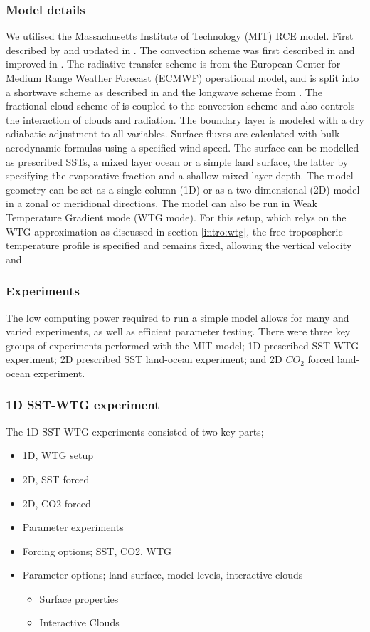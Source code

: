\subsubsection{Model details}
We utilised the Massachusetts Institute of Technology (MIT) RCE model. First 
described by \citet{Renno1994} and updated in \citet{Bony2001}.  The convection 
scheme was first described in \citet{Emanuel1991} and improved in 
\citet{Emanuel1999}. The radiative transfer scheme is from the European Center 
for Medium Range Weather Forecast (ECMWF) operational model, and is split into a 
shortwave scheme as described in \citet{Fouquart1980} and the longwave scheme 
from \citet{Morcrete1991a}. The fractional cloud scheme of \citet{Bony2001} is 
coupled to the convection scheme and also controls the interaction of clouds and 
radiation. The boundary layer is modeled with a dry adiabatic adjustment to all 
variables. Surface fluxes are calculated with bulk aerodynamic formulas using a 
specified wind speed.  The surface can be modelled as prescribed SSTs, a mixed 
layer ocean or a simple land surface, the latter by specifying the evaporative 
fraction and a shallow mixed layer depth. The model geometry can be set as a 
single column (1D) or as a two dimensional (2D) model in a zonal or meridional 
directions. The model can also be run in Weak Temperature Gradient mode (WTG 
mode). For this setup, which relys on the WTG approximation as discussed in 
section \ref{intro:wtg}, the free tropospheric temperature profile is specified 
and remains fixed, allowing the vertical velocity and  

\subsubsection{Experiments}
The low computing power required to run a simple model allows for many and 
varied experiments, as well as efficient parameter testing. There were three key 
groups of experiments performed with the MIT model; 1D prescribed SST-WTG 
experiment; 2D prescribed SST land-ocean experiment; and 2D $CO_2$ forced 
land-ocean experiment.

\subsubsection{1D SST-WTG experiment}
The 1D SST-WTG experiments consisted of two key parts; 

\begin{itemize}
	\item 1D, WTG setup
	\item 2D, SST forced
	\item 2D, CO2 forced
	\item Parameter experiments
	\item Forcing options; SST, CO2, WTG
	\item Parameter options; land surface, model levels, interactive clouds
\begin{itemize}
	\item Surface properties
	\item Interactive Clouds
\end{itemize}
\end{itemize}


